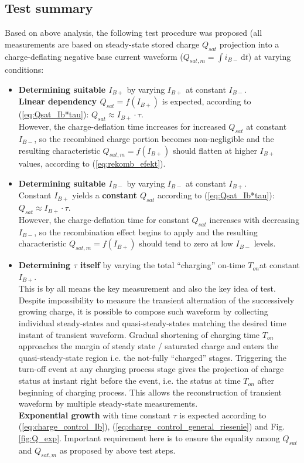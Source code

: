 \documentclass{eeict}
\newcommand{\dif}{\, \mathrm{d}}	%
\begin{document}
\subsection{Test summary} \label{sec:summary}
Based on above analysis, the following test procedure was proposed (all measurements are based on steady-state stored charge $Q_{sat}$ projection into a charge-deflating negative base current waveform ($Q_{sat,m} = \int i_{B-} \dif t$) at varying conditions:
\begin{itemize}
    \item \textbf{Determining suitable $I_{B+}$} by varying $I_{B+}$ at constant $I_{B-}$.\\
	\textbf{Linear dependency $Q_{sat} = f(I_{B+})$} is expected, according to (\ref{eq:Qsat_Ib*tau}): $Q_{sat} \approx I_{B+} \cdot \tau$.\\
	However, the charge-deflation time increases for increased $Q_{sat}$ at constant $I_{B-}$, so the recombined charge portion becomes non-negligible and the resulting characteristic $Q_{sat, m} = f(I_{B+})$ should flatten at higher $I_{B+}$ values, according to (\ref{eq:rekomb_efekt}).
    
    \item \textbf{Determining suitable $I_{B-}$} by varying $I_{B-}$ at constant $I_{B+}$.\\
	Constant $I_{B+}$ yields a \textbf{constant $Q_{sat}$} according to (\ref{eq:Qsat_Ib*tau}): $Q_{sat} \approx I_{B+} \cdot \tau$.\\
	However, the charge-deflation time for constant $Q_{sat}$ increases with decreasing $I_{B-}$, so the recombination effect begins to apply and the resulting characteristic $Q_{sat, m} = f(I_{B+})$ should tend to zero at low $I_{B-}$ levels.
    \item \textbf{Determining $\tau$ itself} by varying the total ``charging'' on-time $T_{on}$at constant $I_{B+}$.\\
	This is by all means the key measurement and also the key idea of test. Despite impossibility to measure the transient alternation of the successively growing charge, it is possible to compose such waveform by collecting individual steady-states and quasi-steady-states matching the desired time instant of transient waveform. Gradual shortening of charging time $T_{on}$ approaches the margin of steady state / saturated charge and enters the quasi-steady-state region i.e. the not-fully ``charged'' stages.
	Triggering the turn-off event at any charging process stage gives the projection of charge status at instant right before the event, i.e. the status at time $T_{on}$ after beginning of charging process. This allows the reconstruction of transient waveform by multiple steady-state measurements.\\
	\textbf{Exponential growth} with time constant $\tau$ is expected according to (\ref{eq:charge_control_Ib}), (\ref{eq:charge_control_general_riesenie}) and Fig. \ref{fig:Q_exp}.
	Important requirement here is to ensure the equality among $Q_{sat}$ and $Q_{sat,m}$ as proposed by above test steps.

\end{itemize}
\end{document}

